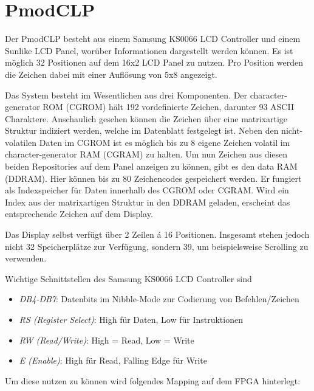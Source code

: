 \chapter{PmodCLP}

Der PmodCLP besteht aus einem Samsung KS0066 LCD Controller und einem Sunlike LCD Panel, worüber Informationen dargestellt werden können. Es ist möglich 32 Positionen auf dem 16x2 LCD Panel zu nutzen. Pro Position werden die Zeichen dabei mit einer Auflösung von 5x8 angezeigt. \newline

Das System besteht im Wesentlichen aus drei Komponenten. Der character-generator ROM (CGROM) hält 192 vordefinierte Zeichen, darunter 93 ASCII Charaktere. Anschaulich gesehen können die Zeichen über eine matrixartige Struktur indiziert werden, welche im Datenblatt festgelegt ist. Neben den nicht-volatilen Daten im CGROM ist es möglich bis zu 8 eigene Zeichen volatil im character-generator RAM (CGRAM) zu halten. Um nun Zeichen aus diesen beiden Repositories auf dem Panel anzeigen zu können, gibt es den data RAM (DDRAM). Hier können bis zu 80 Zeichencodes gespeichert werden. Er fungiert als Indexspeicher für Daten innerhalb des CGROM oder CGRAM. Wird ein Index aus der matrixartigen Struktur in den DDRAM geladen, erscheint das entsprechende Zeichen auf dem Display. \newline

Das Display selbst verfügt über 2 Zeilen á 16 Positionen. Insgesamt stehen jedoch nicht 32 Speicherplätze zur Verfügung, sondern 39, um beispielsweise Scrolling zu verwenden. \newline

Wichtige Schnittstellen des Samsung KS0066 LCD Controller sind

\begin{itemize}
    \item \textit{DB4-DB7}: Datenbits im Nibble-Mode zur Codierung von Befehlen/Zeichen
    \item \textit{RS (Register Select)}: High für Daten, Low für Instruktionen
    \item \textit{RW (Read/Write)}: High = Read, Low = Write
    \item \textit{E (Enable)}: High für Read, Falling Edge für Write
\end{itemize}

Um diese nutzen zu können wird folgendes Mapping auf dem FPGA hinterlegt:\newline

